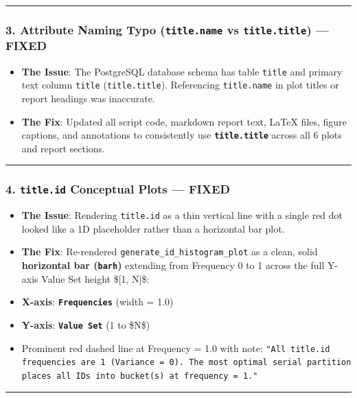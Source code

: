 \documentclass[11pt,a4paper]{article}
\begin{document}
\hrule


\subsubsection{3. Attribute Naming Typo (\texttt{title.name} vs \texttt{title.title}) — \textbf{FIXED}}
\begin{itemize}
\item \textbf{The Issue}: The PostgreSQL database schema has table \texttt{title} and primary text column \texttt{title} (\texttt{title.title}). Referencing \texttt{title.name} in plot titles or report headings was inaccurate.
\item \textbf{The Fix}: Updated all script code, markdown report text, LaTeX files, figure captions, and annotations to consistently use \textbf{\texttt{title.title}} across all 6 plots and report sections.
\end{itemize}

\hrule


\subsubsection{4. \texttt{title.id} Conceptual Plots — \textbf{FIXED}}
\begin{itemize}
\item \textbf{The Issue}: Rendering \texttt{title.id} as a thin vertical line with a single red dot looked like a 1D placeholder rather than a horizontal bar plot.
\item \textbf{The Fix}: Re-rendered \texttt{generate\_id\_histogram\_plot} as a clean, solid \textbf{horizontal bar (\texttt{barh})} extending from Frequency 0 to 1 across the full Y-axis Value Set height \$[1, N]\$:
\item \textbf{X-axis}: \textbf{\texttt{Frequencies}} (width = 1.0)
\item \textbf{Y-axis}: \textbf{\texttt{Value Set}} (1 to \$N\$)
\item Prominent red dashed line at Frequency = 1.0 with note: \texttt{"All title.id frequencies are 1 (Variance = 0). The most optimal serial partition places all IDs into bucket(s) at frequency = 1."}
\end{itemize}

\hrule
\end{document}
